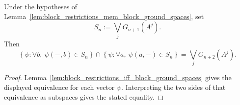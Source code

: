 \begin{lemma}
    \label{lem:block_restriction_intersection_subspace}
    \leanok
    Under the hypotheses of
    Lemma~\ref{lem:block_restrictions_mem_block_ground_spaces}, set
    \[
        S_n:=\bigvee_jG_{n+1}(A^j).
    \]
    Then
    \[
        \left\{\psi:\forall b,\ \psi(-,b)\in S_n\right\}
        \cap
        \left\{\psi:\forall a,\ \psi(a,-)\in S_n\right\}
        =
        \bigvee_jG_{n+2}(A^j).
    \]
\end{lemma}

\begin{proof}
    \leanok
    Lemma~\ref{lem:block_restrictions_iff_block_ground_spaces} gives the
    displayed equivalence for each vector \(\psi\).  Interpreting the two sides
    of that equivalence as subspaces gives the stated equality.
\end{proof}
